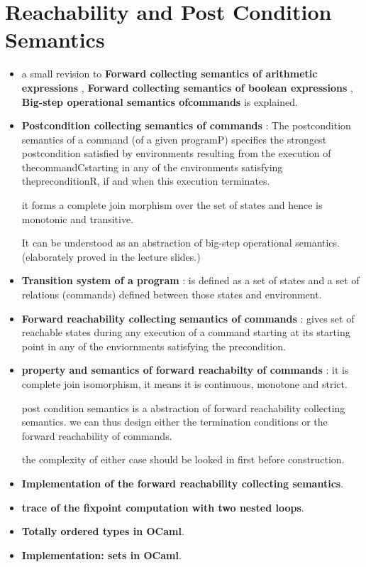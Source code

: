 \chapter{Reachability and Post Condition Semantics}

\begin{itemize}

	\item{ a small revision to \textbf{Forward collecting semantics of arithmetic expressions} , \textbf{Forward collecting semantics of boolean expressions} , \textbf{Big-step operational semantics ofcommands} is explained. 
	}

	\item{\textbf{Postcondition collecting semantics of commands} : The postcondition semantics of a command (of a given programP) specifies the strongest postcondition satisfied by environments resulting from the execution of thecommandCstarting in any of the environments satisfying thepreconditionR, if and when this execution terminates.

	it forms a complete join morphism over the set of states and hence is monotonic and transitive.

	It can be understood as an abstraction of big-step operational semantics. (elaborately proved in the lecture slides.)
	}

	\item{\textbf{Transition system of a program} : is defined as a set of states and a set of relations (commands) defined between those states and environment.
	}

	\item{\textbf{Forward reachability collecting semantics of commands} : gives set of reachable states during any execution of a command starting at its starting point in any of the enviornments satisfying the precondition.
	}

	\item{\textbf{property and semantics of forward reachabilty of commands} : 
	it is complete join isomorphism, it means it is continuous, monotone and strict.

	post condition semantics is a abstraction of forward reachability collecting semantics. we can thus design either the termination conditions or the forward reachability of commands. 

	the complexity of either case should be looked in first before construction.
	}

	\item{\textbf{Implementation of the forward reachability collecting semantics}.
	}

	\item{\textbf{trace of the fixpoint computation with two nested loops}.
	}

	\item{\textbf{Totally ordered types in OCaml}.
	}

	\item{\textbf{Implementation: sets in OCaml}.
	}

\end{itemize}